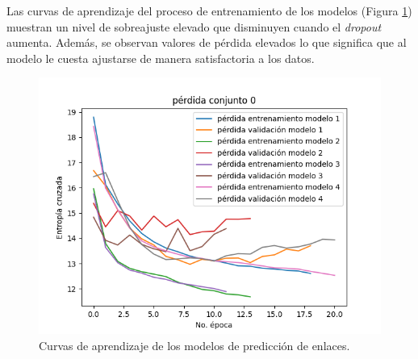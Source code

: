\begin{table}[h!]
	\begin{center}
	\caption{Variantes de arquitectura de los modelos de predicción de enlaces.}\label{table:link_predictor_architecture_table}
	\end{center}
\end{table}

Las curvas de aprendizaje del proceso de entrenamiento de los modelos (Figura \ref{fig:link_prediction_model_loss}) 
muestran un nivel de sobreajuste 
elevado que disminuyen cuando el \emph{dropout} aumenta. Además, se observan valores de pérdida elevados lo que significa 
que al modelo le cuesta ajustarse de manera satisfactoria a los datos.

\begin{figure}[h!]
	\begin{center}
		\includegraphics[scale=.7]{Graphics/persuassive_essays_all_linked_link_prediction_loss_model_1.png}
	    \caption{Curvas de aprendizaje de los modelos de predicción de enlaces.}\label{fig:link_prediction_model_loss}
	\end{center}
\end{figure}

